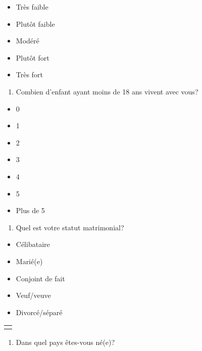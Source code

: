 \documentclass[
  letterpaper,
  DIV=11,
  numbers=noendperiod]{scrreprt}
\providecommand{\tightlist}{%
  \setlength{\itemsep}{0pt}\setlength{\parskip}{0pt}}\usepackage{longtable,booktabs,array}
\begin{document}
\begin{itemize}
\tightlist
\item
  Très faible
\item
  Plutôt faible
\item
  Modéré
\item
  Plutôt fort
\item
  Très fort
\end{itemize}

\begin{enumerate}
\def\labelenumi{\arabic{enumi}.}
\setcounter{enumi}{9}
\tightlist
\item
  Combien d'enfant ayant moins de 18 ans vivent avec vous?
\end{enumerate}

\begin{itemize}
\tightlist
\item
  0
\item
  1
\item
  2
\item
  3
\item
  4
\item
  5
\item
  Plus de 5
\end{itemize}

\begin{enumerate}
\def\labelenumi{\arabic{enumi}.}
\setcounter{enumi}{10}
\tightlist
\item
  Quel est votre statut matrimonial?
\end{enumerate}

\begin{itemize}
\tightlist
\item
  Célibataire
\item
  Marié(e)
\item
  Conjoint de fait
\item
  Veuf/veuve
\item
  Divorcé/séparé
\end{itemize}

\begin{longtable}[]{@{}l@{}}
\toprule\noalign{}
\endhead
\bottomrule\noalign{}
\endlastfoot
\end{longtable}

\begin{enumerate}
\def\labelenumi{\arabic{enumi}.}
\setcounter{enumi}{11}
\tightlist
\item
  Dans quel pays êtes-vous né(e)?
\end{enumerate}
\end{document}
